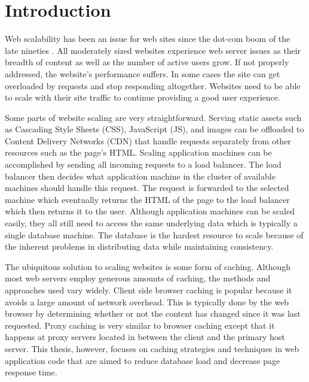 \documentclass[12pt]{ucthesis}
\begin{document}
\pagestyle{plain}




\renewcommand{\baselinestretch}{1.66}


\chapter{Introduction} \label{introduction}
Web scalability has been an issue for web sites since the dot-com boom of the late nineties \cite{webServerScaling}.
All moderately sized websites experience web server issues as their breadth of content as well as the number of active users grow.
If not properly addressed, the website's performance suffers.
In some cases the site can get overloaded by requests and stop responding altogether.
Websites need to be able to scale with their site traffic to continue providing a good user experience.

Some parts of website scaling are very straightforward.
Serving static assets such as Cascading Style Sheets (CSS), JavaScript (JS), and images can be offloaded to Content Delivery Networks (CDN) that handle requests separately from other resources such as the page's HTML.
Scaling application machines can be accomplished by sending all incoming requests to a load balancer.
The load balancer then decides what application machine in the cluster of available machines should handle this request.
The request is forwarded to the selected machine which eventually returns the HTML of the page to the load balancer which then returns it to the user.
Although application machines can be scaled easily, they all still need to access the same underlying data which is typically a single database machine.
The database is the hardest resource to scale because of the inherent problems in distributing data while maintaining consistency.

The ubiquitous solution to scaling websites is some form of caching.
Although most web servers employ generous amounts of caching, the methods and approaches used vary widely.
Client side browser caching is popular because it avoids a large amount of network overhead.
This is typically done by the web browser by determining whether or not the content has changed since it was last requested.
Proxy caching is very similar to browser caching except that it happens at proxy servers located in between the client and the primary host server.
This thesis, however, focuses on caching strategies and techniques in web application code that are aimed to reduce database load and decrease page response time.
\end{document}
